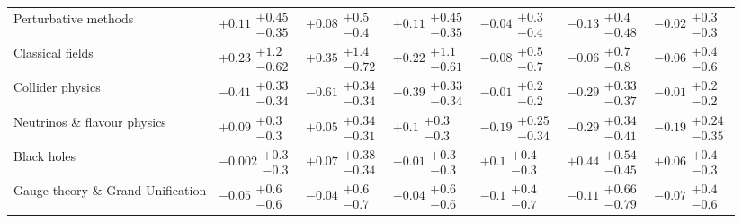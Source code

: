 \begin{table}[H]
\begin{tabular}{lllllll}
Perturbative methods & $+0.11\substack{+0.45 \\ -0.35}$ & $+0.08\substack{+0.5 \\ -0.4}$ & $+0.11\substack{+0.45 \\ -0.35}$ & $-0.04\substack{+0.3 \\ -0.4}$ & $-0.13\substack{+0.4 \\ -0.48}$ & $-0.02\substack{+0.3 \\ -0.3}$ \\
Classical fields & $+0.23\substack{+1.2 \\ -0.62}$ & $+0.35\substack{+1.4 \\ -0.72}$ & $+0.22\substack{+1.1 \\ -0.61}$ & $-0.08\substack{+0.5 \\ -0.7}$ & $-0.06\substack{+0.7 \\ -0.8}$ & $-0.06\substack{+0.4 \\ -0.6}$ \\
Collider physics & $\bm{-0.41}\substack{+0.33 \\ -0.34}$ & $\bm{-0.61}\substack{+0.34 \\ -0.34}$ & $\bm{-0.39}\substack{+0.33 \\ -0.34}$ & $-0.01\substack{+0.2 \\ -0.2}$ & $-0.29\substack{+0.33 \\ -0.37}$ & $-0.01\substack{+0.2 \\ -0.2}$ \\
Neutrinos \& flavour physics & $+0.09\substack{+0.3 \\ -0.3}$ & $+0.05\substack{+0.34 \\ -0.31}$ & $+0.1\substack{+0.3 \\ -0.3}$ & $-0.19\substack{+0.25 \\ -0.34}$ & $-0.29\substack{+0.34 \\ -0.41}$ & $-0.19\substack{+0.24 \\ -0.35}$ \\
Black holes & $-0.002\substack{+0.3 \\ -0.3}$ & $+0.07\substack{+0.38 \\ -0.34}$ & $-0.01\substack{+0.3 \\ -0.3}$ & $+0.1\substack{+0.4 \\ -0.3}$ & $+0.44\substack{+0.54 \\ -0.45}$ & $+0.06\substack{+0.4 \\ -0.3}$ \\
Gauge theory \& Grand Unification & $-0.05\substack{+0.6 \\ -0.6}$ & $-0.04\substack{+0.6 \\ -0.7}$ & $-0.04\substack{+0.6 \\ -0.6}$ & $-0.1\substack{+0.4 \\ -0.7}$ & $-0.11\substack{+0.66 \\ -0.79}$ & $-0.07\substack{+0.4 \\ -0.6}$ \\

\end{tabular}
\end{table}
